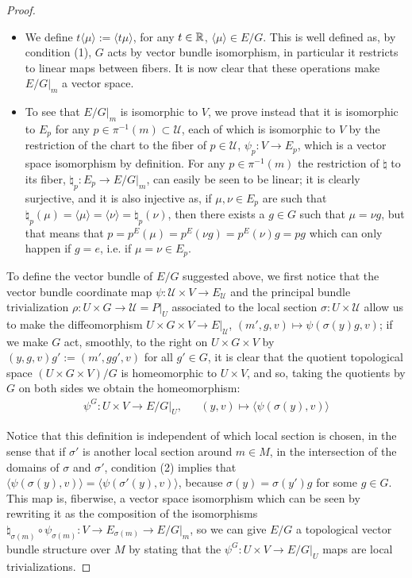 \begin{proof}
\begin{itemize}
    \item We define $t\langle\mu\rangle := \langle t \mu\rangle$, for any $t \in \mathbb{R}$, $\langle\mu\rangle \in E/G$. This is well defined as, by condition (1), $G$ acts by vector bundle isomorphism, in particular it restricts to linear maps between fibers. It is now clear that these operations make $E/G|_m$ a vector space.
    
    \item To see that $E/G|_m$ is isomorphic to $V$, we prove instead that it is isomorphic to $E_p$ for any $p \in \pi^{-1}(m) \subset \mathcal U$, each of which is isomorphic to $V$ by the restriction of the chart to the fiber of $p \in \mathcal U$, $\psi_p: V \to E_p$, which is a vector space isomorphism by definition. For any $p \in \pi^{-1}(m)$ the restriction of $\natural$ to its fiber, $\natural_p:E_p \to E/G|_m$, can easily be seen to be linear; it is clearly surjective, and it is also injective as, if $\mu, \nu \in E_p$ are such that $\natural_p(\mu) = \langle\mu\rangle = \langle\nu\rangle = \natural_p(\nu)$, then there exists a $g \in G$ such that $\mu = \nu g$, but that means that $p = p^E(\mu) = p^E(\nu g) = p^E(\nu)g = pg$ which can only happen if $g = e$, i.e. if $\mu = \nu \in E_p$.
\end{itemize}

To define the vector bundle of $E/G$ suggested above, we first notice that the vector bundle coordinate map $\psi:\mathcal U \times V \to E_\mathcal U$ and the principal bundle trivialization $\rho: U \times G \to \mathcal U = P|_U$ associated to the local section $\sigma: U \times \mathcal U$ allow us to make the diffeomorphism $U \times G \times V \to E|_\mathcal U$, $(m', g, v) \mapsto \psi(\sigma(y)g, v)$; if we make $G$ act, smoothly, to the right on $U \times G \times V$ by $(y, g, v)g' := (m', gg', v)$ for all $g' \in G$, it is clear that the quotient topological space $(U \times G \times V) / G$ is homeomorphic to $U \times V$, and so, taking the quotients by $G$ on both sides we obtain the homeomorphism:
\begin{align*}
    \psi^{G}: U \times V \to E/G|_{U},&& (y, v) \mapsto \langle \psi(\sigma(y), v) \rangle
\end{align*}
    
Notice that this definition is independent of which local section is chosen, in the sense that if $\sigma'$ is another local section around $m \in M$, in the intersection of the domains of $\sigma$ and $\sigma'$, condition (2) implies that $\langle \psi(\sigma(y), v) \rangle  = \langle \psi(\sigma'(y), v) \rangle$, because $\sigma(y) = \sigma(y')g$ for some $g \in G$. This map is, fiberwise, a vector space isomorphism which can be seen by rewriting it as the composition of the isomorphisms $\natural_{\sigma(m)} \circ \psi_{\sigma(m)}: V \to E_{\sigma(m)} \to E/G|_m$, so we can give $E/G$ a topological vector bundle structure over $M$ by stating that the $\psi^{G}:U \times V \to E/G|_U$ maps are local trivializations.


\end{proof}
